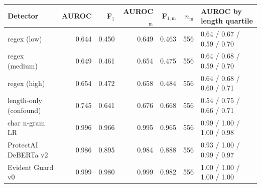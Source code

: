 \begin{tabular}{@{}lrrrrrl@{}}
\toprule
Detector & AUROC & F$_1$ & AUROC$_\mathrm{m}$ & F$_{1,\mathrm{m}}$ & $n_\mathrm{m}$ & AUROC by length quartile \\
\midrule
regex (low) & 0.644 & 0.450 & 0.649 & 0.463 & 556 & 0.64 / 0.67 / 0.59 / 0.70 \\
regex (medium) & 0.649 & 0.461 & 0.654 & 0.475 & 556 & 0.64 / 0.68 / 0.59 / 0.70 \\
regex (high) & 0.654 & 0.472 & 0.658 & 0.484 & 556 & 0.64 / 0.68 / 0.60 / 0.71 \\
length-only (confound) & 0.745 & 0.641 & 0.676 & 0.668 & 556 & 0.54 / 0.75 / 0.66 / 0.71 \\
char n-gram LR & 0.996 & 0.966 & 0.995 & 0.965 & 556 & 0.99 / 1.00 / 1.00 / 0.98 \\
ProtectAI DeBERTa v2 & 0.986 & 0.895 & 0.984 & 0.888 & 556 & 0.93 / 1.00 / 0.99 / 0.97 \\
Evident Guard v0 & 0.999 & 0.980 & 0.999 & 0.982 & 556 & 1.00 / 1.00 / 1.00 / 1.00 \\
\bottomrule
\end{tabular}
